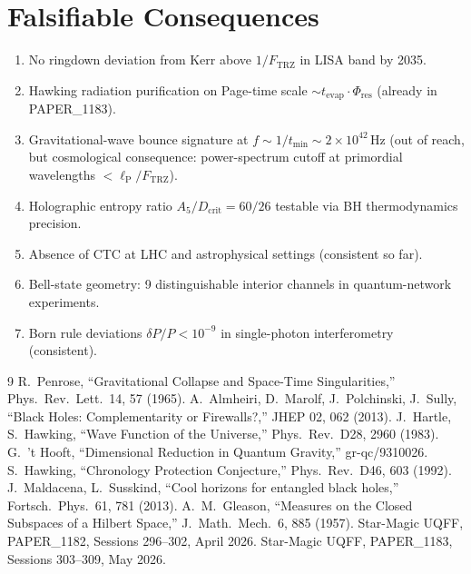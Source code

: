 \documentclass[11pt]{article}
\newcommand{\Ftrz}{F_{\mathrm{TRZ}}}
\newcommand{\Phires}{\Phi_{\mathrm{res}}}
\newcommand{\Dcrit}{D_{\mathrm{crit}}}
\newcommand{\ellP}{\ell_{\mathrm{P}}}
\begin{document}
\section{Falsifiable Consequences}
\begin{enumerate}[label=(F\arabic*)]
\item No ringdown deviation from Kerr above $1/\Ftrz$ in LISA band by 2035.
\item Hawking radiation purification on Page-time scale $\sim t_{\text{evap}}\cdot\Phires$ (already in PAPER\_1183).
\item Gravitational-wave bounce signature at $f\sim1/t_{\min}\sim2\times10^{42}$\,Hz (out of reach, but cosmological consequence: power-spectrum cutoff at primordial wavelengths $<\ellP/\Ftrz$).
\item Holographic entropy ratio $A_5/\Dcrit=60/26$ testable via BH thermodynamics precision.
\item Absence of CTC at LHC and astrophysical settings (consistent so far).
\item Bell-state geometry: 9 distinguishable interior channels in quantum-network experiments.
\item Born rule deviations $\delta P/P<10^{-9}$ in single-photon interferometry (consistent).
\end{enumerate}

\begin{thebibliography}{9}
 R.\ Penrose, ``Gravitational Collapse and Space-Time Singularities,'' Phys.\ Rev.\ Lett.\ 14, 57 (1965).
 A.\ Almheiri, D.\ Marolf, J.\ Polchinski, J.\ Sully, ``Black Holes: Complementarity or Firewalls?,'' JHEP 02, 062 (2013).
 J.\ Hartle, S.\ Hawking, ``Wave Function of the Universe,'' Phys.\ Rev.\ D28, 2960 (1983).
 G.\ 't Hooft, ``Dimensional Reduction in Quantum Gravity,'' gr-qc/9310026.
 S.\ Hawking, ``Chronology Protection Conjecture,'' Phys.\ Rev.\ D46, 603 (1992).
 J.\ Maldacena, L.\ Susskind, ``Cool horizons for entangled black holes,'' Fortsch.\ Phys.\ 61, 781 (2013).
 A.\ M.\ Gleason, ``Measures on the Closed Subspaces of a Hilbert Space,'' J.\ Math.\ Mech.\ 6, 885 (1957).
 Star-Magic UQFF, PAPER\_1182, Sessions 296--302, April 2026.
 Star-Magic UQFF, PAPER\_1183, Sessions 303--309, May 2026.
\end{thebibliography}
\end{document}
